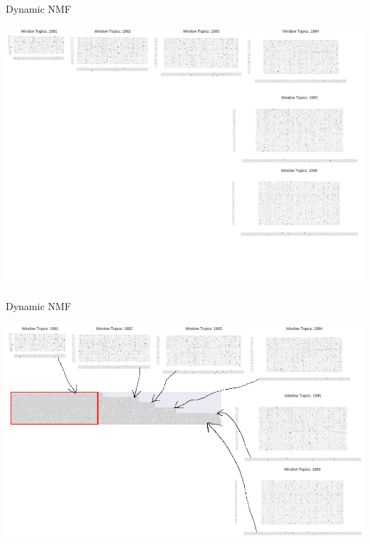 \documentclass[9pt]{beamer}
\begin{document}
\begin{frame}[t]{Dynamic NMF}

\includegraphics[width=\linewidth]{../plots/sustainability/conceptual_windows_only}

\end{frame}

\begin{frame}[t]{Dynamic NMF}

\includegraphics[width=\linewidth]{../plots/sustainability/conceptual_annotated_1}

\end{frame}
\end{document}
